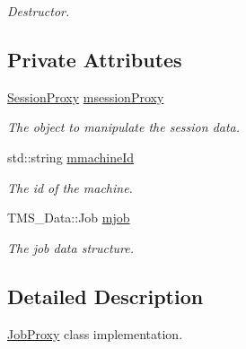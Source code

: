 \begin{DoxyCompactItemize}
\begin{DoxyCompactList}\small\item\em Destructor. \item\end{DoxyCompactList}\end{DoxyCompactItemize}
\subsection*{Private Attributes}
\begin{DoxyCompactItemize}
\item 
\hypertarget{classJobProxy_aa9cbf0c97b77522039c3e6d466600b80}{
\hyperlink{classSessionProxy}{SessionProxy} \hyperlink{classJobProxy_aa9cbf0c97b77522039c3e6d466600b80}{msessionProxy}}
\label{classJobProxy_aa9cbf0c97b77522039c3e6d466600b80}

\begin{DoxyCompactList}\small\item\em The object to manipulate the session data. \item\end{DoxyCompactList}\item 
\hypertarget{classJobProxy_a2b903e7774b9bf5abcf675c6f56700c2}{
std::string \hyperlink{classJobProxy_a2b903e7774b9bf5abcf675c6f56700c2}{mmachineId}}
\label{classJobProxy_a2b903e7774b9bf5abcf675c6f56700c2}

\begin{DoxyCompactList}\small\item\em The id of the machine. \item\end{DoxyCompactList}\item 
\hypertarget{classJobProxy_a3fec0f0cad24fb926cc12213b932ffb4}{
TMS\_\-Data::Job \hyperlink{classJobProxy_a3fec0f0cad24fb926cc12213b932ffb4}{mjob}}
\label{classJobProxy_a3fec0f0cad24fb926cc12213b932ffb4}

\begin{DoxyCompactList}\small\item\em The job data structure. \item\end{DoxyCompactList}\end{DoxyCompactItemize}


\subsection{Detailed Description}
\hyperlink{classJobProxy}{JobProxy} class implementation. 

